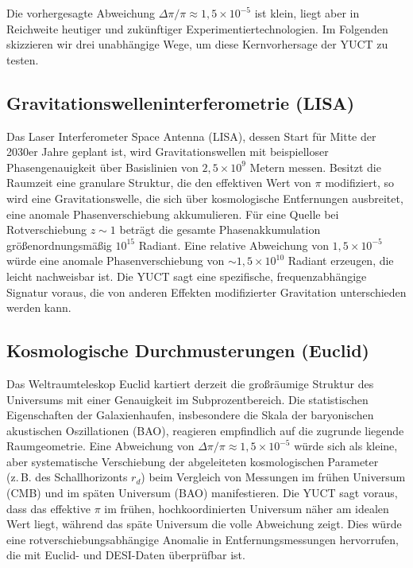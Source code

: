 \documentclass[12pt,a4paper]{article}
\begin{document}
	Die vorhergesagte Abweichung \(\Delta\pi/\pi \approx 1{,}5\times10^{-5}\) ist klein, liegt aber in Reichweite heutiger und zukünftiger Experimentiertechnologien. Im Folgenden skizzieren wir drei unabhängige Wege, um diese Kernvorhersage der YUCT zu testen.
	
	\subsection{Gravitationswelleninterferometrie (LISA)}
	
	Das Laser Interferometer Space Antenna (LISA), dessen Start für Mitte der 2030er Jahre geplant ist, wird Gravitationswellen mit beispielloser Phasengenauigkeit über Basislinien von \(2{,}5\times10^9\) Metern messen. Besitzt die Raumzeit eine granulare Struktur, die den effektiven Wert von \(\pi\) modifiziert, so wird eine Gravitationswelle, die sich über kosmologische Entfernungen ausbreitet, eine anomale Phasenverschiebung akkumulieren. Für eine Quelle bei Rotverschiebung \(z \sim 1\) beträgt die gesamte Phasenakkumulation größenordnungsmäßig \(10^{15}\) Radiant. Eine relative Abweichung von \(1{,}5\times10^{-5}\) würde eine anomale Phasenverschiebung von \(\sim 1{,}5\times10^{10}\) Radiant erzeugen, die leicht nachweisbar ist. Die YUCT sagt eine spezifische, frequenzabhängige Signatur voraus, die von anderen Effekten modifizierter Gravitation unterschieden werden kann.
	
	\subsection{Kosmologische Durchmusterungen (Euclid)}
	
	Das Weltraumteleskop Euclid kartiert derzeit die großräumige Struktur des Universums mit einer Genauigkeit im Subprozentbereich. Die statistischen Eigenschaften der Galaxienhaufen, insbesondere die Skala der baryonischen akustischen Oszillationen (BAO), reagieren empfindlich auf die zugrunde liegende Raumgeometrie. Eine Abweichung von \(\Delta\pi/\pi \approx 1{,}5\times10^{-5}\) würde sich als kleine, aber systematische Verschiebung der abgeleiteten kosmologischen Parameter (z. B. des Schallhorizonts \(r_d\)) beim Vergleich von Messungen im frühen Universum (CMB) und im späten Universum (BAO) manifestieren. Die YUCT sagt voraus, dass das effektive \(\pi\) im frühen, hochkoordinierten Universum näher am idealen Wert liegt, während das späte Universum die volle Abweichung zeigt. Dies würde eine rotverschiebungsabhängige Anomalie in Entfernungsmessungen hervorrufen, die mit Euclid- und DESI-Daten überprüfbar ist.
	
\end{document}
